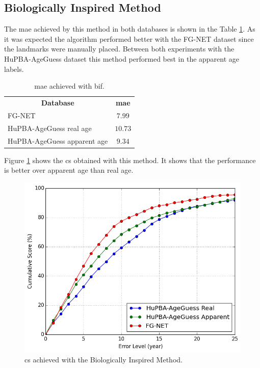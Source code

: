 \subsection{Biologically Inspired Method}

The \gls{mae} achieved by this method in both databases is shown in the Table \ref{tab:BIFresults}. As it was expected the algorithm performed better with the FG-NET dataset since the landmarks were manually placed. Between both experiments with the HuPBA-AgeGuess dataset this method performed best in the apparent age labels.

\begin{table}[!h]
	\centering
	\begin{tabular}{|l||c|}
		\hline
		\multicolumn{1}{|c||}{\textbf{Database}} & \textbf{\gls{mae}}\\ \hhline{=#=}
		FG-NET & $7.99$\\ 		\hline
		HuPBA-AgeGuess real age & $10.73$\\ \hline
		HuPBA-AgeGuess apparent age & $9.34$\\ \hline
			
	\end{tabular}
	\caption{\acrshort{mae} achieved with \acrshort{bif}.}
	\label{tab:BIFresults}
\end{table}

Figure \ref{fig:cumS_BIF} shows the \gls{cs} obtained with this method. It shows that the performance is better over apparent age than real age.

\begin{figure}[!h]
	\centering
	\includegraphics[width=\textwidth]{figures/cum_score}
	\caption{\acrshort{cs} achieved with the Biologically Inspired Method.}
	\label{fig:cumS_BIF}
\end{figure}

